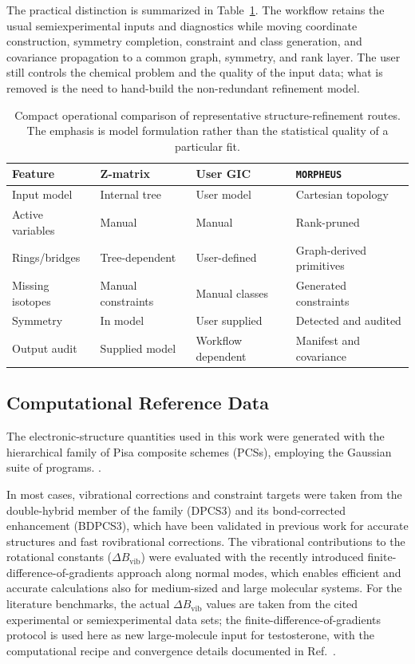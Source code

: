 \documentclass[aip,jcp,reprint,longbibliography,floatfix]{revtex4-2}
\begin{document}
The practical distinction is summarized in Table~\ref{tab:workflow-comparison}.
The workflow retains the usual semiexperimental inputs and diagnostics while
moving coordinate construction, symmetry completion, constraint and class
generation, and covariance propagation to a common graph, symmetry, and rank
layer. The
user still controls the chemical problem and the quality of the input data;
what is removed is the need to hand-build the non-redundant refinement model.

\begin{table}
\caption{Compact operational comparison of representative
structure-refinement routes. The emphasis is model formulation rather than the
statistical quality of a particular fit.}
\label{tab:workflow-comparison}
\footnotesize
\setlength{\tabcolsep}{5pt}
\begin{tabular}{@{}llll@{}}
\toprule
Feature & Z-matrix & User GIC & \texttt{MORPHEUS} \\
\midrule
Input model & Internal tree & User model & Cartesian topology \\
Active variables & Manual & Manual & Rank-pruned \\
Rings/bridges & Tree-dependent & User-defined & Graph-derived primitives \\
Missing isotopes & Manual constraints & Manual classes & Generated constraints \\
Symmetry & In model & User supplied & Detected and audited \\
Output audit & Supplied model & Workflow dependent & Manifest and covariance \\
\bottomrule
\end{tabular}
\end{table}


\subsection{Computational Reference Data}

The electronic-structure quantities used in this work were generated with the
hierarchical family of Pisa composite schemes (PCSs),\cite{pcs1234_2024,Lazzari2025LCB25} employing the Gaussian suite of programs.
\cite{g16}.

In most cases, vibrational corrections and constraint targets were taken from the
double-hybrid member of the family (DPCS3) and its bond-corrected enhancement (BDPCS3),
which have been validated in previous work for accurate structures and fast rovibrational corrections.\cite{wires_2025,Mendolicchio2025FastDvib,acr_2026}
The vibrational contributions to the rotational constants
($\Delta B_\mathrm{vib}$) were evaluated with the recently introduced
finite-difference-of-gradients approach along normal modes, which enables
efficient and accurate calculations also for medium-sized and large molecular
systems.\cite{Mendolicchio2025FastDvib} For the literature benchmarks, the
actual $\Delta B_\mathrm{vib}$ values are taken from the cited experimental or
semiexperimental data sets; the finite-difference-of-gradients protocol is used
here as new large-molecule input for testosterone, with the computational
recipe and convergence details documented in Ref.~.
\end{document}
